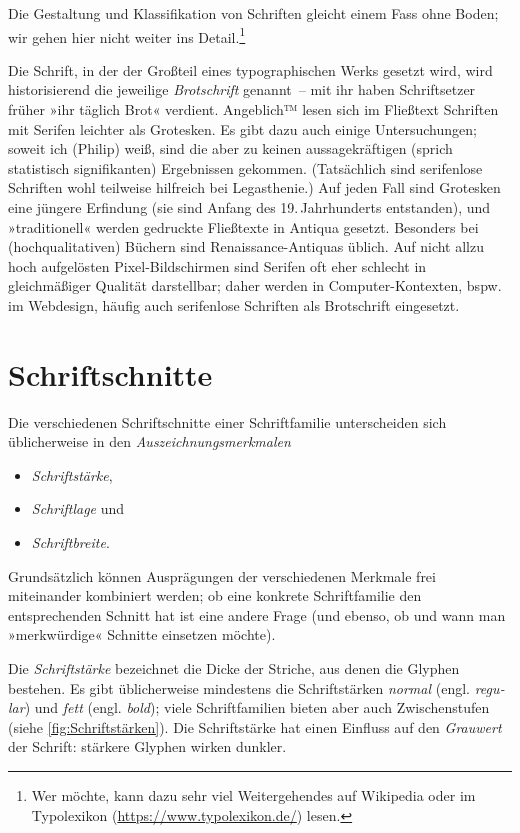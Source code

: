 Die Gestaltung und Klassifikation von Schriften gleicht einem Fass
ohne Boden; wir gehen hier nicht weiter ins Detail.\footnote{Wer
  möchte, kann dazu sehr viel Weitergehendes auf Wikipedia oder im
  Typo\-lexikon (\url{https://www.typolexikon.de/}) lesen.}

Die Schrift, in der der Großteil eines typographischen Werks gesetzt
wird, wird historisierend die jeweilige \emph{Brotschrift} genannt~--
mit ihr haben Schriftsetzer früher »ihr täglich Brot« verdient.
Angeblich™ lesen sich im Fließtext Schriften mit Serifen leichter als
Grotesken.  Es gibt dazu auch einige Untersuchungen; soweit ich
(Philip) weiß, sind die aber zu keinen aussagekräftigen (sprich
statistisch signifikanten) Ergebnissen gekommen.  (Tatsächlich sind
serifenlose Schriften wohl teilweise hilfreich bei Legasthenie.)  Auf
jeden Fall sind Grotesken eine jüngere Erfindung (sie sind Anfang des
19.\,Jahrhunderts entstanden), und »traditionell« werden gedruckte
Fließtexte in Antiqua gesetzt.  Besonders bei (hochqualitativen)
Büchern sind Renaissance-Antiquas üblich.  Auf nicht allzu hoch
aufgelösten Pixel-Bildschirmen sind Serifen oft eher schlecht in
gleichmäßiger Qualität darstellbar; daher werden in
Computer-Kontexten, bspw. im Webdesign, häufig auch serifenlose
Schriften als Brotschrift eingesetzt.

\section{Schriftschnitte}
\label{sec:Schnitte}

Die verschiedenen Schriftschnitte einer Schriftfamilie unterscheiden
sich üblicherweise in den \emph{Auszeichnungsmerkmalen}
\begin{itemize}
\item \emph{Schriftstärke},
\item \emph{Schriftlage} und
\item \emph{Schriftbreite}.
\end{itemize}
Grundsätzlich können Ausprägungen der verschiedenen Merkmale frei
miteinander kombiniert werden; ob eine konkrete Schriftfamilie den
entsprechenden Schnitt hat ist eine andere Frage (und ebenso, ob und
wann man »merkwürdige« Schnitte einsetzen möchte).

Die \emph{Schriftstärke} bezeichnet die Dicke der Striche, aus denen
die Glyphen bestehen.  Es gibt üblicherweise mindestens die
Schriftstärken \emph{normal}
(engl. \emph{\foreignlanguage{british}{regular}}) und \emph{fett}
(engl. \emph{\foreignlanguage{british}{bold}}); viele Schriftfamilien
bieten aber auch Zwischenstufen (siehe \cref{fig:Schriftstärken}).
Die Schriftstärke hat einen Einfluss auf den \emph{Grauwert} der
Schrift: stärkere Glyphen wirken dunkler.

